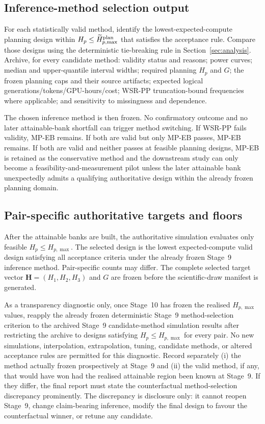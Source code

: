 \documentclass[11pt,a4paper]{article}
\begin{document}
\subsection{Inference-method selection output}
For each statistically valid method, identify the lowest-expected-compute planning design within $H_p\le\widetilde H_{p,\max}^{\rm plan}$ that satisfies the acceptance rule. Compare those designs using the deterministic tie-breaking rule in Section~\ref{sec:analysis}. Archive, for every candidate method: validity status and reasons; power curves; median and upper-quantile interval widths; required planning $H_p$ and $G$; the frozen planning caps and their source artifacts; expected logical generations/tokens/GPU-hours/cost; WSR-PP truncation-bound frequencies where applicable; and sensitivity to missingness and dependence.

The chosen inference method is then frozen. No confirmatory outcome and no later attainable-bank shortfall can trigger method switching. If WSR-PP fails validity, MP-EB remains. If both are valid but only MP-EB passes, MP-EB remains. If both are valid and neither passes at feasible planning designs, MP-EB is retained as the conservative method and the downstream study can only become a feasibility-and-measurement pilot unless the later attainable bank unexpectedly admits a qualifying authoritative design within the already frozen planning domain.

\subsection{Pair-specific authoritative targets and floors}
After the attainable banks are built, the authoritative simulation evaluates only feasible $H_p\le H_{p,\max}$. The selected design is the lowest expected-compute valid design satisfying all acceptance criteria under the already frozen Stage~9 inference method. Pair-specific counts may differ. The complete selected target vector $\mathbf H=(H_1,H_2,H_3)$ and $G$ are frozen before the scientific-draw manifest is generated.

As a transparency diagnostic only, once Stage~10 has frozen the realised $H_{p,\max}$ values, reapply the already frozen deterministic Stage~9 method-selection criterion to the archived Stage~9 candidate-method simulation results after restricting the archive to designs satisfying $H_p\le H_{p,\max}$ for every pair. No new simulations, interpolation, extrapolation, tuning, candidate methods, or altered acceptance rules are permitted for this diagnostic. Record separately (i) the method actually frozen prospectively at Stage~9 and (ii) the valid method, if any, that would have won had the realised attainable region been known at Stage~9. If they differ, the final report must state the counterfactual method-selection discrepancy prominently. The discrepancy is disclosure only: it cannot reopen Stage~9, change claim-bearing inference, modify the final design to favour the counterfactual winner, or retune any candidate.
\end{document}
